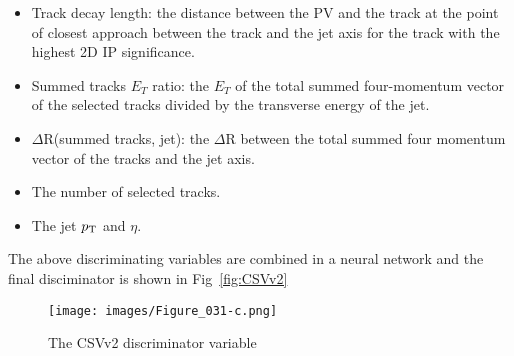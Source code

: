 \begin{itemize}
\item Track decay length: the distance between the PV and the track at the point of closest approach between the track and the jet axis for the track with the highest 2D IP significance.
\item Summed tracks $E_T$ ratio: the $E_T$ of the total summed four-momentum vector of the selected tracks divided by the transverse energy of the jet.
\item $\Delta$R(summed tracks, jet): the $\Delta$R between the total summed four momentum vector of the tracks and the jet axis.
\item The number of selected tracks.
\item The jet $p_{\mathrm{T}}$ and $\eta$.
\end{itemize}
The above discriminating variables are combined in a neural network and the final disciminator is shown in Fig~\ref{fig:CSVv2}
\begin{figure}[!h]
\centering
\texttt{[image: images/Figure\_031-c.png]}\\
\caption{The CSVv2 discriminator variable\cite{Sirunyan:2017ezt}}
\label{sig:feynmanEWK}
\end{figure}

\section{\ptmiss}
